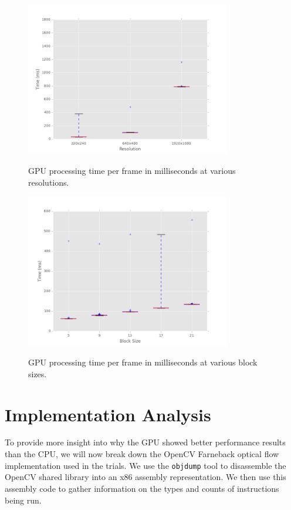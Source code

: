 \documentclass[12pt,letterpaper]{article}
\begin{document}
\begin{figure}[H]
  \centering
    \includegraphics[width=0.8\textwidth]{gpu_resolution.png}
  \label{fig:gpures}
  \caption{GPU processing time per frame in milliseconds at various resolutions.}
\end{figure}

\begin{figure}[H]
  \centering
    \includegraphics[width=0.8\textwidth]{gpu_blocksize.png}
  \label{fig:gpublock}
  \caption{GPU processing time per frame in milliseconds at various block sizes.}
\end{figure}

\section{Implementation Analysis}
To provide more insight into why the GPU showed better performance results than
the CPU, we will now break down the OpenCV Farneback optical flow implementation
used in the trials. We use the \texttt{objdump} tool to disassemble the OpenCV
shared library into an x86 assembly representation. We then use this assembly
code to gather information on the types and counts of instructions being run.
\end{document}
